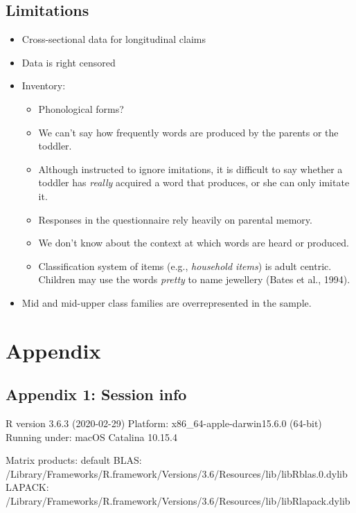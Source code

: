 \documentclass[english,man,man,floatsintext]{apa6}
\providecommand{\tightlist}{%
  \setlength{\itemsep}{0pt}\setlength{\parskip}{0pt}}
\begin{document}
\hypertarget{limitations}{%
\subsection{Limitations}\label{limitations}}

\begin{itemize}
\tightlist
\item
  Cross-sectional data for longitudinal claims
\item
  Data is right censored\\
\item
  Inventory:

  \begin{itemize}
  \tightlist
  \item
    Phonological forms?
  \item
    We can't say how frequently words are produced by the parents or the toddler.
  \item
    Although instructed to ignore imitations, it is difficult to say whether a toddler has \emph{really} acquired a word that produces, or she can only imitate it.
  \item
    Responses in the questionnaire rely heavily on parental memory.
  \item
    We don't know about the context at which words are heard or produced.
  \item
    Classification system of items (e.g., \emph{household items}) is adult centric. Children may use the words \emph{pretty} to name jewellery (Bates et al., 1994).
  \end{itemize}
\item
  Mid and mid-upper class families are overrepresented in the sample.
\end{itemize}

\hypertarget{appendix}{%
\section{Appendix}\label{appendix}}

\hypertarget{appendix-1-session-info}{%
\subsection{Appendix 1: Session info}\label{appendix-1-session-info}}

R version 3.6.3 (2020-02-29)
Platform: x86\_64-apple-darwin15.6.0 (64-bit)
Running under: macOS Catalina 10.15.4

Matrix products: default
BLAS: /Library/Frameworks/R.framework/Versions/3.6/Resources/lib/libRblas.0.dylib
LAPACK: /Library/Frameworks/R.framework/Versions/3.6/Resources/lib/libRlapack.dylib
\end{document}

